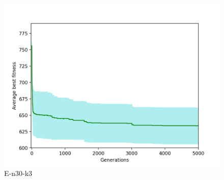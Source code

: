 \documentclass[conference,compsoc]{IEEEtran}
\begin{document}
\begin{figure}[h!]
    \centering
    \includegraphics[scale=0.35]{E-n30-k3}
    \caption{E-n30-k3}
    \label{fig:my_label}
\end{figure}
\end{document}
